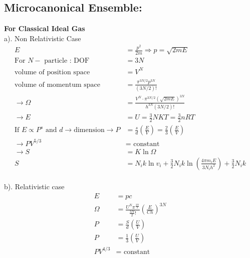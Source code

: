 \subsection{Microcanonical Ensemble:}
\textbf{For Classical Ideal Gas }\\
a). Non Relativistic Case
\begin{align*}
E&=\frac{p^{2}}{2 m} \Rightarrow p=\sqrt{2 m E}\\
\text{For }N-\text{ particle : DOF }&=3 N\\
\text{volume of position space }&=V^{N}\\
\text{volume of momentum space }&=\frac{\pi^{3 N / 2} p^{3 N}}{(3 N / 2) !}\\
\rightarrow \Omega&=\frac{V^{N} \cdot \pi^{3 N / 2}(\sqrt{2 m E})^{3 N}}{h^{3 N}(3 N / 2) !}\\
\rightarrow E&=U=\frac{3}{2} N K T=\frac{3}{2} n R T \\
\text{If }E\propto P^s \text{ and }d \rightarrow\text{dimension}
\rightarrow P&=\frac{s}{d}\left(\frac{E}{V}\right)=\frac{2}{3}\left(\frac{E}{V}\right) \\
\rightarrow P V^{5 / 3}&=\text { constant } \\
\rightarrow S&=K \ln \Omega\\
S&=N_{i} k \ln v_{i}+\frac{3}{2} N_{i} k \ln \left(\frac{4 \pi m_{i} E}{3 N_{i} h^{2}}\right)+\frac{3}{2} N_{i} k
\end{align*}\\
b). Relativistic case\\
\begin{align*}
E&=pc\\
\Omega&=\frac{U^N\pi^\frac{3N}{2}}{\frac{3N}{2}!}\left(\frac{E}{C h}\right)^{3 N}\\
P&=\frac{S}{d}\left(\frac{U}{V} \right) \\
P&=\frac{1}{3}\left(\frac{U}{V}\right)\\
P V^{4 / 3}&=\text { constant }
\end{align*}
